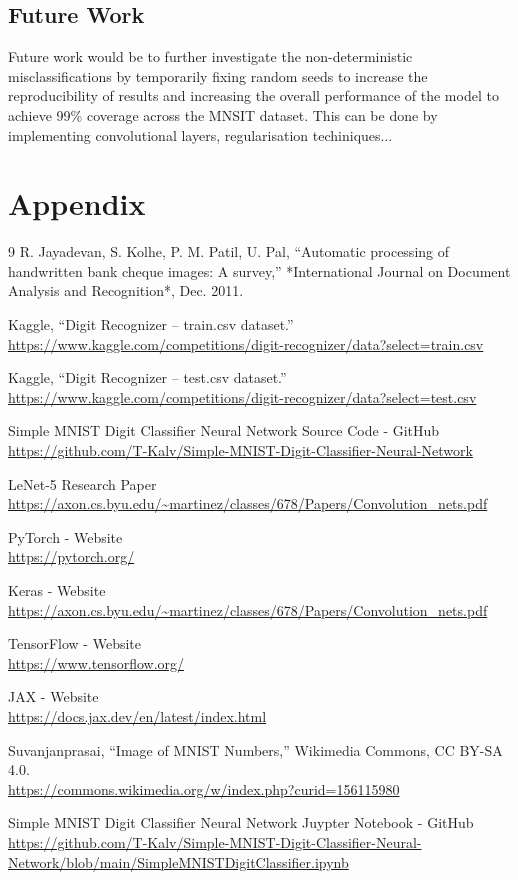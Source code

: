\documentclass[11pt]{article}
\begin{document}
\subsection{Future Work}
Future work would be to further investigate the non-deterministic misclassifications by temporarily fixing random seeds to increase the reproducibility of results and increasing the overall performance of the model to achieve 99\% coverage across the MNSIT dataset. This can be done by implementing convolutional layers, regularisation techiniques...

\appendix
\section*{Appendix}

\begin{thebibliography}{9}
R. Jayadevan, S. Kolhe, P. M. Patil, U. Pal,
“Automatic processing of handwritten bank cheque images: A survey,”
*International Journal on Document Analysis and Recognition*, Dec. 2011.

Kaggle, “Digit Recognizer – train.csv dataset.” \\
\url{https://www.kaggle.com/competitions/digit-recognizer/data?select=train.csv}

Kaggle, “Digit Recognizer – test.csv dataset.” \\
\url{https://www.kaggle.com/competitions/digit-recognizer/data?select=test.csv}

Simple MNIST Digit Classifier Neural Network Source Code - GitHub \\
\url{https://github.com/T-Kalv/Simple-MNIST-Digit-Classifier-Neural-Network}

LeNet-5 Research Paper \\
\url{https://axon.cs.byu.edu/~martinez/classes/678/Papers/Convolution_nets.pdf}

PyTorch - Website \\
\url{https://pytorch.org/}

Keras - Website \\
\url{https://axon.cs.byu.edu/~martinez/classes/678/Papers/Convolution_nets.pdf}

TensorFlow - Website \\
\url{https://www.tensorflow.org/}

JAX - Website \\
\url{https://docs.jax.dev/en/latest/index.html}

Suvanjanprasai, “Image of MNIST Numbers,” Wikimedia Commons, CC BY-SA 4.0.\\
\url{https://commons.wikimedia.org/w/index.php?curid=156115980}


Simple MNIST Digit Classifier Neural Network Juypter Notebook - GitHub\\
\url{https://github.com/T-Kalv/Simple-MNIST-Digit-Classifier-Neural-Network/blob/main/SimpleMNISTDigitClassifier.ipynb}

\end{thebibliography}
\end{document}
